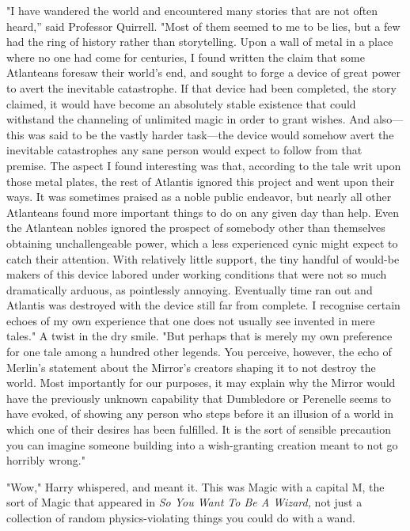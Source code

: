 "I have wandered the world and encountered many stories that are not often
heard,'' said Professor Quirrell. "Most of them seemed to me to be lies, but a
few had the ring of history rather than storytelling. Upon a wall of metal in a
place where no one had come for centuries, I found written the claim that some
Atlanteans foresaw their world's end, and sought to forge a device of great
power to avert the inevitable catastrophe. If that device had been completed,
the story claimed, it would have become an absolutely stable existence that
could withstand the channeling of unlimited magic in order to grant wishes. And
also---this was said to be the vastly harder task---the device would somehow
avert the inevitable catastrophes any sane person would expect to follow from
that premise. The aspect I found interesting was that, according to the tale
writ upon those metal plates, the rest of Atlantis ignored this project and
went upon their ways. It was sometimes praised as a noble public endeavor, but
nearly all other Atlanteans found more important things to do on any given day
than help. Even the Atlantean nobles ignored the prospect of somebody other
than themselves obtaining unchallengeable power, which a less experienced cynic
might expect to catch their attention. With relatively little support, the tiny
handful of would-be makers of this device labored under working conditions that
were not so much dramatically arduous, as pointlessly annoying. Eventually time
ran out and Atlantis was destroyed with the device still far from complete. I
recognise certain echoes of my own experience that one does not usually see
invented in mere tales." A twist in the dry smile. "But perhaps that is merely
my own preference for one tale among a hundred other legends. You perceive,
however, the echo of Merlin's statement about the Mirror's creators shaping it
to not destroy the world. Most importantly for our purposes, it may explain why
the Mirror would have the previously unknown capability that Dumbledore or
Perenelle seems to have evoked, of showing any person who steps before it an
illusion of a world in which one of their desires has been fulfilled. It is the
sort of sensible precaution you can imagine someone building into a
wish-granting creation meant to not go horribly wrong."

"Wow," Harry whispered, and meant it. This was Magic with a capital M, the sort
of Magic that appeared in \emph{So You Want To Be A Wizard,} not just a
collection of random physics-violating things you could do with a wand.

